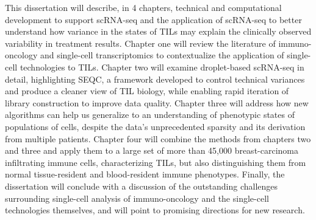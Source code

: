 This dissertation will describe, in 4 chapters, technical and computational development to support scRNA-seq and the application of scRNA-seq to better understand how variance in the states of TILs may explain the clinically observed variability in treatment results.
Chapter one will review the literature of immuno-oncology and single-cell transcriptomics to contextualize the application of single-cell technologies to TILs.
Chapter two will examine droplet-based scRNA-seq in detail, highlighting SEQC, a framework developed to control technical variances and produce a cleaner view of TIL biology, while enabling rapid iteration of library construction to improve data quality. 
Chapter three will address how new algorithms can help us generalize to an understanding of phenotypic states of populations of cells, despite the data's unprecedented sparsity and its derivation from multiple patients.  
Chapter four will combine the methods from chapters two and three and apply them to a large set of more than 45,000 breast-carcinoma infiltrating immune cells, characterizing TILs, but also distinguishing them from normal tissue-resident and blood-resident immune phenotypes.
Finally, the dissertation will conclude with a discussion of the outstanding challenges surrounding single-cell analysis of immuno-oncology and the single-cell technologies themselves, and will point to promising directions for new research.

